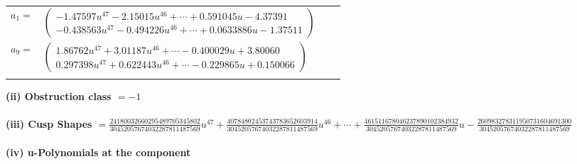 \documentclass[1p]{elsarticle_modified}
\theoremstyle{definition}
\begin{document}
\begin{tabular}{m{7pt} m{180pt} m{7pt} m{180pt} }
\flushright $a_{1}=$&$\begin{pmatrix}-1.47597 u^{47}-2.15015 u^{46}+\cdots+0.591045 u-4.37391\\-0.438563 u^{47}-0.494226 u^{46}+\cdots+0.0633886 u-1.37511\end{pmatrix}$ \\
\flushright $a_{9}=$&$\begin{pmatrix}1.86762 u^{47}+3.01187 u^{46}+\cdots-0.400029 u+3.80060\\0.297398 u^{47}+0.622443 u^{46}+\cdots-0.229865 u+0.150066\end{pmatrix}$\\&\end{tabular}
\flushleft \textbf{(ii) Obstruction class $= -1$}\\~\\
\flushleft \textbf{(iii) Cusp Shapes $= \frac{24180032660295489705345802}{30452057674032287811487569} u^{47}+\frac{40784802453743783652603914}{30452057674032287811487569} u^{46}+\cdots+\frac{461511678046237890102384932}{30452057674032287811487569} u-\frac{260983278311950731604691300}{30452057674032287811487569}$}\\~\\
\newpage\renewcommand{\arraystretch}{1}
\flushleft \textbf{(iv) u-Polynomials at the component}\newline \\
\end{document}
